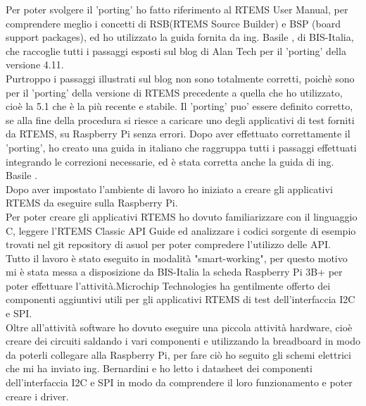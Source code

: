 \documentclass[12pt, a4paper, titlepage, oneside]{book}
\begin{document}
\begin{flushleft}
Per poter svolgere il 'porting' ho fatto riferimento al RTEMS User Manual\cite{rtemsUM}, per comprendere meglio i concetti di RSB(RTEMS Source Builder) e BSP (board support packages), 
ed ho utilizzato la guida fornita da ing. Basile \cite{giorgio}, di BIS-Italia, che raccoglie tutti i passaggi esposti sul blog di Alan Tech per il 'porting' della versione 4.11.\\
Purtroppo i passaggi illustrati sul blog non sono totalmente corretti, poichè sono per il 'porting' della versione di RTEMS precedente a quella che ho utilizzato, cioè la 5.1 che è la più recente e stabile.
Il 'porting' puo' essere definito corretto, se alla fine della procedura si riesce a caricare uno degli applicativi di test forniti da RTEMS, su Raspberry Pi senza errori.
Dopo aver effettuato correttamente il 'porting', ho creato una guida in italiano  che raggruppa tutti i passaggi effettuati integrando le correzioni necessarie, ed è stata corretta anche la guida di ing. Basile \cite{giorgio5}.\\
Dopo aver impostato l'ambiente di lavoro ho iniziato a creare gli applicativi RTEMS da eseguire sulla Raspberry Pi.\\
Per poter creare gli applicativi RTEMS ho dovuto  familiarizzare con il linguaggio C, leggere l'RTEMS Classic API Guide \cite{rtemsCAG} ed analizzare i codici sorgente di esempio trovati nel git repository di asuol\cite{asuol} per poter compredere l'utilizzo delle API. \\
Tutto il lavoro è stato eseguito in modalità "smart-working", per questo motivo mi è stata messa a disposizione da BIS-Italia la scheda Raspberry Pi 3B+ per poter effettuare l'attività.Microchip Technologies ha gentilmente offerto dei componenti aggiuntivi utili per gli applicativi RTEMS di test dell'interfaccia I2C e SPI.\\
Oltre all'attività software ho dovuto eseguire una piccola attività hardware, cioè creare dei circuiti saldando i vari componenti e utilizzando la breadboard in modo da poterli collegare alla Raspberry Pi, per fare ciò ho seguito gli schemi elettrici che mi ha inviato ing. Bernardini e ho letto i datasheet dei componenti dell'interfaccia I2C \cite{microchipMCP3425} \cite{microchipADC} e  SPI \cite{microchipMCP4822} \cite{microchipMSOP10-8} in modo da comprendere il loro funzionamento e poter creare i driver.\\


\end{flushleft}
\end{document}
